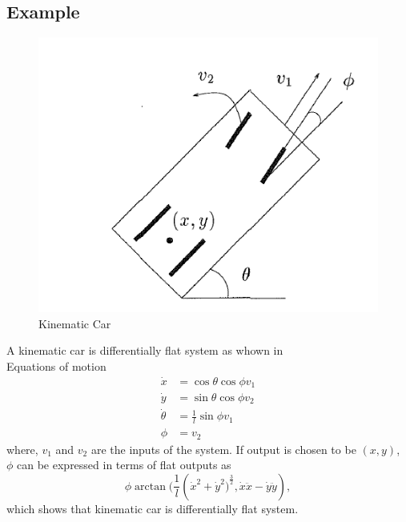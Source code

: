 \documentclass[conference,onecolumn,10pt]{IEEEtran}
\begin{document}
\subsection{Example}
\begin{figure}[h!]
\centering
\includegraphics[scale=0.4]{images/car.png}
\caption{Kinematic Car}
\label{Car}
\end{figure}
A kinematic car is differentially flat system as whown in \cite{van1997trajectory} \\
Equations of motion 
\begin{equation}
\begin{aligned}
\dot{x} &= \cos \theta \cos \phi v_1 \\
\dot{y} &= \sin \theta \cos \phi v_2 \\
\dot{\theta} &= \frac{1}{l}\sin \phi v_1 \\
\phi &= v_2
\end{aligned}
\end{equation}
where, $v_1$ and $v_2$ are the inputs of the system.
If output is chosen to be $(x, y)$, $\phi$ can be expressed in terms of flat outputs as 
\begin{equation}
\phi \arctan (\frac{1}{l}({\dot{x}^2+\dot{y}^2)}^{\frac{3}{2}},\dot{x}\ddot{x}-\dot{y}\ddot{y}),
\end{equation}
which shows that kinematic car is differentially flat system.
\end{document}

